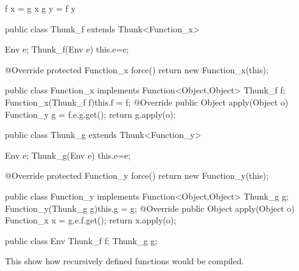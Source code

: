 \documentclass[12pt,a4paper,twoside]{article}
\begin{document}
\begin{JavaLst}
f x = g x
g y = f y

public class Thunk_f extends Thunk<Function_x> {
    Env e;
    Thunk_f(Env e) {this.e=e;}

    @Override
    protected Function_x force() {
        return new Function_x(this);
    }
}

public class Function_x implements Function<Object,Object> {
    Thunk_f f;
    Function_x(Thunk_f f){this.f = f;}
    @Override
    public Object apply(Object o) {
        Function_y g = f.e.g.get();
        return g.apply(o);
    }
}

public class Thunk_g extends Thunk<Function_y> {
    Env e;
    Thunk_g(Env e) {this.e=e;}

    @Override
    protected Function_y force() {
        return new Function_y(this);
    }
}

public class Function_y implements Function<Object,Object> {
    Thunk_g g;
    Function_y(Thunk_g g){this.g = g;}
    @Override
    public Object apply(Object o) {
        Function_x x = g.e.f.get();
        return x.apply(o);
    }
}

public class Env {
    Thunk_f f;
    Thunk_g g;
}
\end{JavaLst}

This show how recursively defined functions would be compiled.
\end{document}
